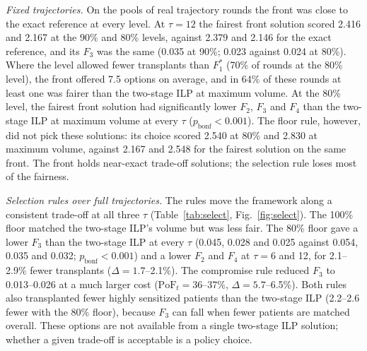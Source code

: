 \documentclass[journal]{IEEEtran}
\newcommand{\pof}{\ensuremath{\mathrm{PoF}_t}}
\begin{document}
\emph{Fixed trajectories.} On the pools of real trajectory rounds the
front was close to the exact reference at every level. At $\tau = 12$
the fairest front solution scored 2.416 and 2.167 at the 90\% and
80\% levels, against 2.379 and 2.146 for the exact reference, and its
$F_3$ was the same (0.035 at 90\%; 0.023 against 0.024 at 80\%).
Where the level allowed fewer transplants than $F_1^{*}$ (70\% of
rounds at the 80\% level), the front offered 7.5 options on average,
and in 64\% of these rounds at least one was fairer than the two-stage
ILP at maximum volume. At the 80\% level, the fairest front solution
had significantly lower $F_2$, $F_3$ and $F_4$ than the two-stage ILP
at maximum volume at every $\tau$ ($p_{\mathrm{bonf}} < 0.001$). The
floor rule, however, did not pick these solutions: its choice scored
2.540 at 80\% and 2.830 at maximum volume, against 2.167 and 2.548 for
the fairest solution on the same front. The front holds near-exact
trade-off solutions; the selection rule loses most of the fairness.

\emph{Selection rules over full trajectories.} The rules move the
framework along a consistent trade-off at all three $\tau$
(Table~\ref{tab:select}, Fig.~\ref{fig:select}). The 100\% floor matched
the two-stage ILP's volume but was less fair. The 80\% floor gave a
lower $F_3$ than the two-stage ILP at every $\tau$ (0.045, 0.028 and
0.025 against 0.054, 0.035 and 0.032; $p_{\mathrm{bonf}} < 0.001$) and
a lower $F_2$ and $F_4$ at $\tau = 6$ and 12, for 2.1--2.9\% fewer
transplants ($\Delta = 1.7$--2.1\%). The compromise rule reduced $F_3$
to 0.013--0.026 at a much larger cost ($\pof = 36$--37\%,
$\Delta = 5.7$--6.5\%). Both rules also transplanted fewer highly
sensitized patients than the two-stage ILP (2.2--2.6 fewer with the
80\% floor), because $F_3$ can fall when fewer patients are matched
overall. These options are not available from a single two-stage ILP
solution; whether a given trade-off is acceptable is a policy choice.
\end{document}
